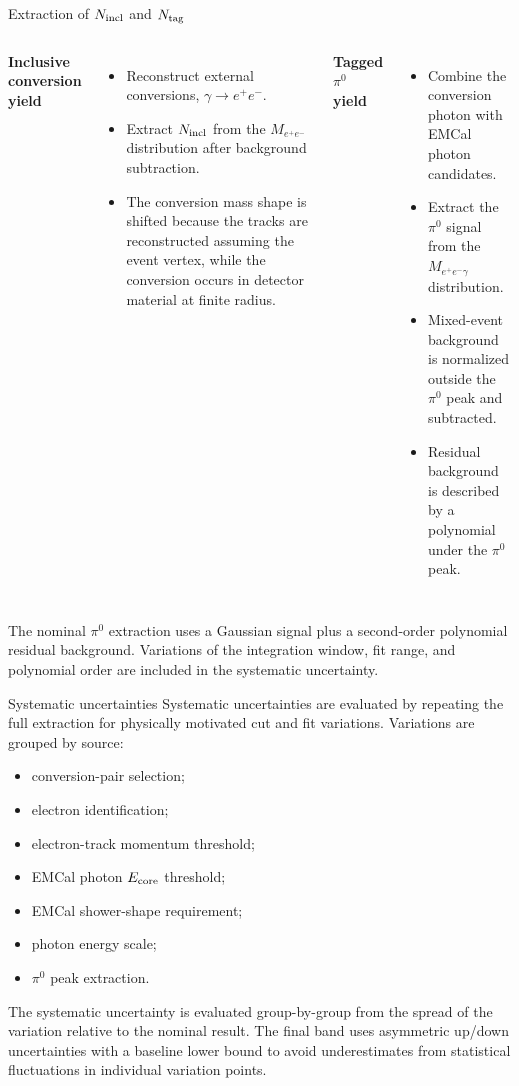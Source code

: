 \documentclass[10pt, dvipsnames]{beamer}
\begin{document}
\begin{frame}{Extraction of $N_{\rm incl}$ and $N_{\rm tag}$}
   \small
   \begin{columns}[T,onlytextwidth]
      \textbf{Inclusive conversion yield}
      \begin{itemize}
         \item Reconstruct external conversions, $\gamma\rightarrow e^+e^-$.
         \item Extract $N_{\rm incl}$ from the $M_{e^+e^-}$ distribution after background subtraction.
         \item The conversion mass shape is shifted because the tracks are reconstructed assuming the event vertex, while the conversion occurs in detector material at finite radius.
      \end{itemize}
      \textbf{Tagged $\pi^0$ yield}
      \begin{itemize}
         \item Combine the conversion photon with EMCal photon candidates.
         \item Extract the $\pi^0$ signal from the $M_{e^+e^-\gamma}$ distribution.
         \item Mixed-event background is normalized outside the $\pi^0$ peak and subtracted.
         \item Residual background is described by a polynomial under the $\pi^0$ peak.
      \end{itemize}
   \end{columns}
   \vspace{0.4em}
   The nominal $\pi^0$ extraction uses a Gaussian signal plus a second-order polynomial residual background.  Variations of the integration window, fit range, and polynomial order are included in the systematic uncertainty.
\end{frame}

   \begin{frame}{Systematic uncertainties}
   \small
   Systematic uncertainties are evaluated by repeating the full extraction for physically motivated cut and fit variations.  Variations are grouped by source:
   \begin{itemize}
      \item conversion-pair selection;
      \item electron identification;
      \item electron-track momentum threshold;
      \item EMCal photon $E_{\rm core}$ threshold;
      \item EMCal shower-shape requirement;
      \item photon energy scale;
      \item $\pi^0$ peak extraction.
   \end{itemize}
   \vspace{0.4em}
   The systematic uncertainty is evaluated group-by-group from the spread of the variation relative to the nominal result.  The final band uses asymmetric up/down uncertainties with a baseline lower bound to avoid underestimates from statistical fluctuations in individual variation points.
\end{frame}
\end{document}
